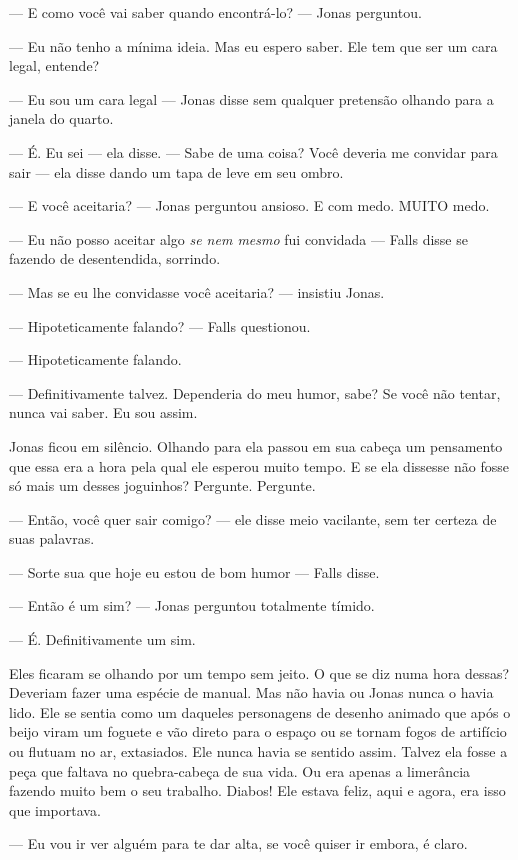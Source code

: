 --- E como você vai saber quando encontrá-lo? --- Jonas perguntou.

--- Eu não tenho a mínima ideia. Mas eu espero saber. Ele tem que ser um cara legal, entende?

--- Eu sou um cara legal --- Jonas disse\mudanca{,} sem qualquer pretensão\mudanca{,} olhando para a janela do quarto.

--- É. Eu sei --- ela disse. --- Sabe de uma coisa? Você deveria me convidar para sair --- ela disse dando um tapa de leve em seu ombro.

--- E você aceitaria? --- Jonas perguntou ansioso. E com medo. MUITO medo.

--- Eu não posso aceitar algo \emph{se nem mesmo} fui convidada --- Falls disse se fazendo de desentendida, sorrindo.

--- Mas se eu lhe convidasse você aceitaria? --- insistiu Jonas.

--- Hipoteticamente falando? --- Falls questionou.

--- Hipoteticamente falando.

--- Definitivamente talvez. Dependeria do meu humor, sabe? Se você não tentar, nunca vai saber. Eu sou assim.

Jonas ficou em silêncio. Olhando para ela passou em sua cabeça um pensamento que essa era a hora pela qual ele esperou muito tempo. E se ela dissesse não fosse só mais um desses joguinhos? Pergunte. Pergunte.

--- Então, você quer sair comigo? --- ele disse meio vacilante, sem ter certeza de suas palavras.

--- Sorte sua que hoje eu estou de bom humor --- Falls disse.

--- Então é um sim? --- Jonas perguntou totalmente tímido.

--- É. Definitivamente um sim.

Eles ficaram se olhando por um tempo sem jeito. O que se diz numa hora dessas? Deveriam fazer uma espécie de manual. Mas não havia ou Jonas nunca o havia lido. Ele se sentia como um daqueles personagens de desenho animado que após o beijo viram um foguete e vão direto para o espaço ou se tornam fogos de artifício ou flutuam no ar, extasiados. Ele nunca havia se sentido assim. Talvez ela fosse a peça que faltava no quebra-cabeça de sua vida. Ou era apenas a limerância fazendo muito bem o seu trabalho. Diabos! Ele estava feliz, aqui e agora, era isso que importava.

--- Eu vou ir ver alguém para te dar alta, se você quiser ir embora, é claro.


